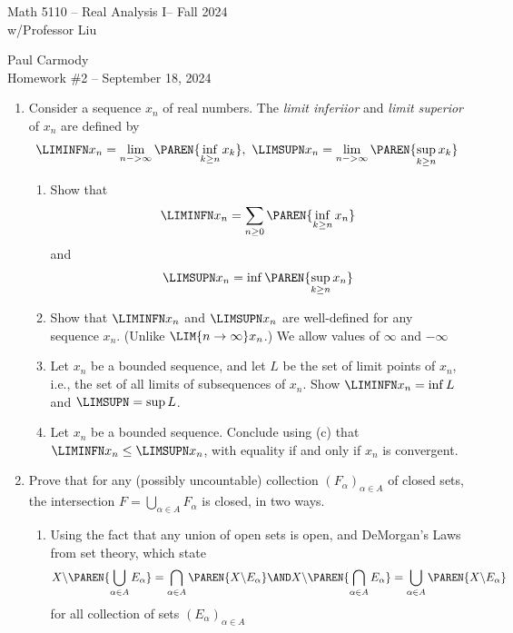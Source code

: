 \documentclass[10pt,a4paper]{report}
\newcommand{\CLASSNAME}{Math 5110 -- Real Analysis I}
\newcommand{\STUDENTNAME}{Paul Carmody}
\newcommand{\ASSIGNMENT}{Homework \#2 }
\newcommand{\DUEDATE}{September 18, 2024}
\newcommand{\SEMESTER}{Fall 2024}
\begin{document}
\begin{center}
	\Large{\CLASSNAME -- \SEMESTER} \\
	\large{ w/Professor Liu}
\end{center}
\begin{center}
	\STUDENTNAME \\
	\ASSIGNMENT -- \DUEDATE\\
\end{center} 

\begin{enumerate}[label=\Roman*.]
\item Consider a sequence $x_n$ of real numbers.  The \textit{limit inferiior} and \textit{limit superior} of $x_n$ are defined by 
\begin{align*}
	\LIMINFN x_n = \lim_{n->\infty}\PAREN{\inf_{k \ge n} x_k }, \,\, \LIMSUPN x_n = \lim_{n->\infty}\PAREN{\sup_{k \ge n} x_k }
\end{align*}
	\begin{enumerate}[label=(\alph*)]
		\item Show that
			\begin{align*}
				\LIMINFN x_n = \sum_{n\ge 0} \PAREN{\inf_{k\ge n} x_n}
			\end{align*}and
			\begin{align*}
				\LIMSUPN x_n = \inf\PAREN{\sup_{k\ge n} x_n}
			\end{align*}
		\item Show that $\LIMINFN x_n$ and $\LIMSUPN x_n$ are well-defined for any sequence $x_n$.  (Unlike $\LIM{n\to\infty} x_n$.)  We allow values of $\infty$ and $-\infty$
		\item Let $x_n$ be a bounded sequence, and let $L$ be the set of limit points of $x_n$, i.e., the set of all limits of subsequences of $x_n$.  Show $\LIMINFN x_n = \inf L$ and $\LIMSUPN = \sup L$.
		\item Let $x_n$ be a bounded sequence.  Conclude using (c) that $\LIMINFN x_n \le \LIMSUPN x_n$, with equality if and only if $x_n$ is convergent.
	\end{enumerate}
	
	\item Prove that for any (possibly uncountable) collection $(F_\alpha)_{\alpha\in A}$ of closed sets, the intersection $F = \bigcup_{\alpha \in A} F_\alpha$ is closed, in two ways.
	\begin{enumerate}[label=(\alph*)]
		\item Using the fact that any union of open sets is open, and DeMorgan's Laws from set theory, which state
		\begin{align*}
			X\backslash \PAREN{\bigcup_{\alpha\in A} E_\alpha } = \bigcap_{\alpha \in A} \PAREN{X \backslash E_\alpha} \AND X\backslash\PAREN{\bigcap_{\alpha \in A} E_\alpha} = \bigcup_{\alpha\in A} \PAREN{X \backslash E_\alpha}
		\end{align*}for all collection of sets $(E_\alpha)_{\alpha\in A}$
		

\end{enumerate}
\end{enumerate}
\end{document}
